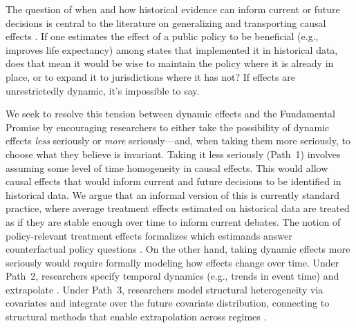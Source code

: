 \documentclass{article}
\begin{document}
The question of when and how historical evidence can inform current or future decisions is central to the literature on generalizing and transporting causal effects \citep{coleGeneralizingEvidenceRandomized2010,tiptonImprovingGeneralizationsExperiments2013,manskiPublicPolicyUncertain2013}. If one estimates the effect of a public policy to be beneficial (e.g., improves life expectancy) among states that implemented it in historical data, does that mean it would be wise to maintain the policy where it is already in place, or to expand it to jurisdictions where it has not? If effects are unrestrictedly dynamic, it's impossible to say. 

We seek to resolve this tension between dynamic effects and the Fundamental Promise by encouraging researchers to either take the possibility of dynamic effects \textit{less} seriously or \textit{more} seriously---and, when taking them more seriously, to choose what they believe is invariant. Taking it less seriously (Path~1) involves assuming some level of time homogeneity in causal effects. This would allow causal effects that would inform current and future decisions to be identified in historical data. We argue that an informal version of this is currently standard practice, where average treatment effects estimated on historical data are treated as if they are stable enough over time to inform current debates. The notion of policy-relevant treatment effects formalizes which estimands answer counterfactual policy questions \citep{heckmanPolicyRelevantTreatmentEffects2001,sasakiEstimationInferencePolicy2023}. On the other hand, taking dynamic effects more seriously would require formally modeling how effects change over time. Under Path~2, researchers specify temporal dynamics (e.g., trends in event time) and extrapolate \citep{khosrowiExtrapolationCausalEffects2019,maebaExtrapolationTreatmentEffect2024}. Under Path~3, researchers model structural heterogeneity via covariates and integrate over the future covariate distribution, connecting to structural methods that enable extrapolation across regimes \citep{lucasjrEconometricPolicyEvaluation1976,heckmanStructuralEquationsTreatment2005,pearlExternalValidityCalculus2022}.
\end{document}
